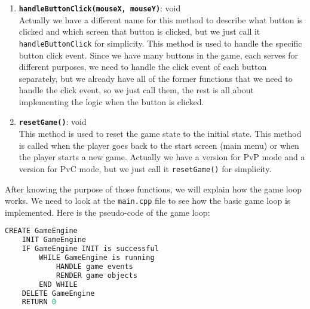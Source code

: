 \begin{enumerate}
    \item \textbf{\texttt{handleButtonClick(mouseX, mouseY)}}: void
    \\ Actually we have a different name for this method to describe what button is clicked and which screen that button is clicked, but we just call it \texttt{handleButtonClick} for simplicity. This method is used to handle the specific button click event. Since we have many buttons in the game, each serves for different purposes, we need to handle the click event of each button separately, but we already have all of the former functions that we need to handle the click event, so we just call them, the rest is all about implementing the logic when the button is clicked.
    \item \textbf{\texttt{resetGame()}}: void 
    \\ This method is used to reset the game state to the initial state. This method is called when the player goes back to the start screen (main menu) or when the player starts a new game. Actually we have a version for PvP mode and a version for PvC mode, but we just call it \texttt{resetGame()} for simplicity.
\end{enumerate}

\hspace{1cm} After knowing the purpose of those functions, we will explain how the game loop works. We need to look at the \texttt{main.cpp} file to see how the basic game loop is implemented. Here is the pseudo-code of the game loop:

\begin{lstlisting}[language=C++, caption=Game Loop Pseudo Code]
    CREATE GameEngine
    INIT GameEngine
    IF GameEngine INIT is successful
        WHILE GameEngine is running
            HANDLE game events
            RENDER game objects
        END WHILE
    DELETE GameEngine
    RETURN 0
\end{lstlisting}

